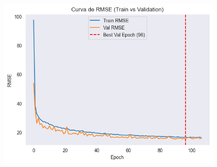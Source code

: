 \begin{figure}[H]
\begin{minipage}{0.48\textwidth}
		\vspace{0.2cm}
		\includegraphics[width=\linewidth]{includes/cap5/graphs/sid2_trafficformer_rmse.png}
	\end{minipage}
	\label{fig:curvas_sid2_trafficformer}
\end{figure}


